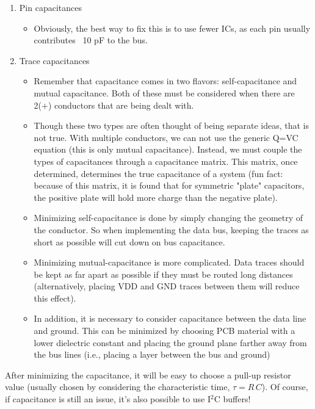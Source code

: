 \documentclass{article}
\begin{document}
\begin{enumerate}
	\item Pin capacitances
	\begin{itemize}
		\item Obviously, the best way to fix this is to use fewer ICs, as each pin usually contributes ~10 pF to the bus.
	\end{itemize}
	\item Trace capacitances
	\begin{itemize}
		\item Remember that capacitance comes in two flavors: self-capacitance and mutual capacitance. Both of these must be considered when there are 2(+) conductors that are being dealt with.
		\item Though these two types are often thought of being separate ideas, that is not true. With multiple conductors, we can not use the generic Q=VC equation (this is only mutual capacitance). Instead, we must couple the types of capacitances through a capacitance matrix. This matrix, once determined, determines the true capacitance of a system (fun fact: because of this matrix, it is found that for symmetric "plate" capacitors, the positive plate will hold more charge than the negative plate).
		\item Minimizing self-capacitance is done by simply changing the geometry of the conductor. So when implementing the data bus, keeping the traces as short as possible will cut down on bus capacitance.
		\item Minimizing mutual-capacitance is more complicated. Data traces should be kept as far apart as possible if they must be routed long distances (alternatively, placing VDD and GND traces between them will reduce this effect).
		\item In addition, it is necessary to consider capacitance between the data line and ground. This can be minimized by choosing PCB material with a lower dielectric constant and placing the ground plane farther away from the bus lines (i.e., placing a layer between the bus and ground)
	\end{itemize}
\end{enumerate}

\noindent After minimizing the capacitance, it will be easy to choose a pull-up resistor value (usually chosen by considering the characteristic time, \(\tau = R \, C\)). Of course, if capacitance is still an issue, it's also possible to use I\(^2\)C buffers!
\end{document}
